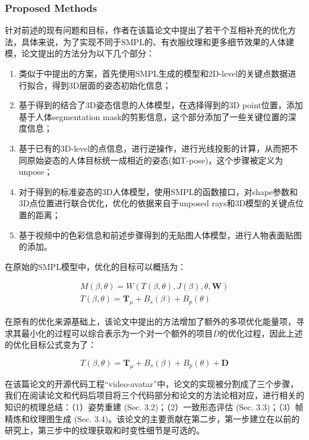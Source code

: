 \documentclass{article}
\begin{document}
\subsubsection{Proposed Methods}
针对前述的现有问题和目标，作者在该篇论文中提出了若干个互相补充的优化方法，具体来说，为了实现不同于SMPL的、有衣服纹理和更多细节效果的人体建模，论文提出的方法分为以下几个部分：

\begin{enumerate}
	\item 类似于\cite{2Dkeypoint}中提出的方案，首先使用SMPL生成的模型和2D-level的关键点数据进行拟合，得到3D层面的姿态初始化信息；
	\item 基于得到的结合了3D姿态信息的人体模型，在选择得到的3D point位置，添加基于人体segmentation mask的剪影信息，这个部分添加了一些关键位置的深度信息；
	\item 基于已有的3D-level的点信息，进行逆操作，进行光线投影的计算，从而把不同原始姿态的人体目标统一成相近的姿态(如T-pose)，这个步骤被定义为unpose；
	\item 对于得到的标准姿态的3D人体模型，使用SMPL的函数接口，对shape参数和3D点位置进行联合优化，优化的依据来自于unposed rays和3D模型的关键点位置的距离；
	\item 基于视频中的色彩信息和前述步骤得到的无贴图人体模型，进行人物表面贴图的添加。
\end{enumerate}

在原始的SMPL模型中，优化的目标可以概括为：

\begin{align}
		M(\beta, \theta) = W(T(\beta, \theta), J(\beta), \theta, \mathbf{W})\\
		T(\beta, \theta) = \mathbf{T}_\mu + B_s(\beta) + B_p(\theta) 
\end{align}

在原有的优化来源基础上，该论文中提出的方法增加了额外的多项优化能量项，寻求其最小化的过程可以综合表示为一个对一个额外的项目$D$的优化过程，因此上述的优化目标公式变为了：

\begin{equation}
	T(\beta, \theta) = \mathbf{T}_\mu + B_s(\beta) + B_p(\theta) + \mathbf{D}
\end{equation}

在该篇论文的开源代码工程“video-avatar”中，论文的实现被分割成了三个步骤，我们在阅读论文和代码后项目将三个代码部分和论文的方法论相对应，进行相关的知识的梳理总结：（1）姿势重建 (Sec. 3.2)；（2）一致形态评估 (Sec. 3.3)；（3）帧精炼和纹理图生成 (Sec. 3.4)。该论文的主要贡献在第二步，第一步建立在以前的研究上，第三步中的纹理获取和时变性细节是可选的。
\end{document}
